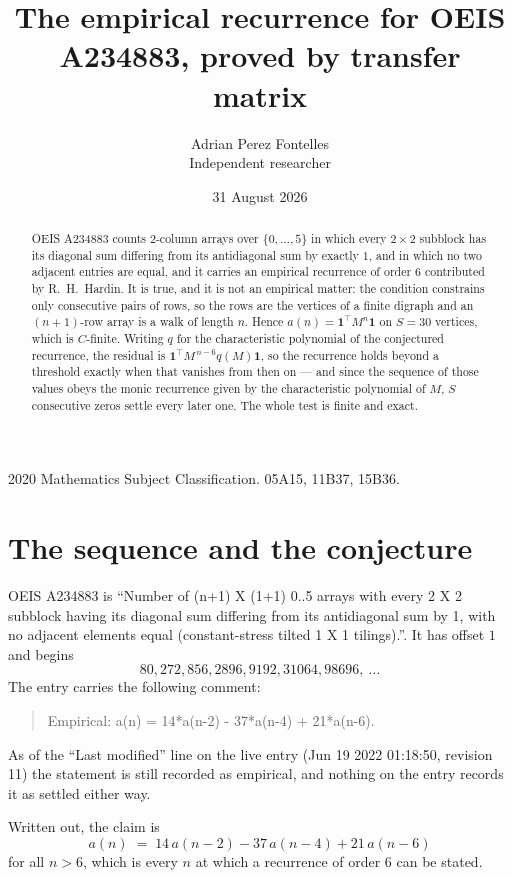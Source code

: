 \documentclass[11pt,a4paper]{article}
\title{The empirical recurrence for OEIS A234883, proved by transfer matrix}
\author{Adrian Perez Fontelles\\ \small Independent researcher}
\date{31 August 2026}
\theoremstyle{plain}
\theoremstyle{definition}
\begin{document}
\maketitle

\begin{abstract}
OEIS A234883 counts $2$-column arrays over $\{0,\dots,5\}$ in which every
$2\times2$ subblock has its diagonal sum differing from its antidiagonal sum by
exactly $1$, and in which no two adjacent entries are equal, and it
carries an empirical recurrence of order $6$ contributed by R.~H.~Hardin. It is true,
and it is not an empirical matter: the condition constrains only consecutive pairs of rows,
so the rows are the vertices of a finite digraph and an $(n+1)$-row array is a walk of
length $n$. Hence $a(n)=\mathbf{1}^{\!\top}M^{n}\mathbf{1}$ on $S=30$ vertices, which
is $C$-finite. Writing $q$ for the characteristic polynomial of the conjectured recurrence,
the residual is $\mathbf{1}^{\!\top}M^{\,n-6}q(M)\mathbf{1}$, so the recurrence
holds beyond a threshold exactly when that vanishes from then on --- and since the sequence
of those values obeys the monic recurrence given by the characteristic polynomial of $M$,
$S$ consecutive zeros settle every later one. The whole test is finite and exact.
\end{abstract}

\noindent\small 2020 Mathematics Subject Classification. 05A15, 11B37, 15B36.\normalsize

\section{The sequence and the conjecture}

OEIS A234883 is ``Number of (n+1) X (1+1) 0..5 arrays with every 2 X 2 subblock having its diagonal sum differing from its antidiagonal sum by 1, with no adjacent elements equal (constant-stress tilted 1 X 1 tilings).''. It has offset
$1$ and begins
\[
80, 272, 856, 2896, 9192, 31064, 98696,\ \dots
\]
The entry carries the following comment:
\begin{quote}\small
Empirical: a(n) = 14*a(n-2) - 37*a(n-4) + 21*a(n-6).
\end{quote}
As of the ``Last modified'' line on the live entry (Jun 19 2022 01:18:50, revision 11) the statement is
still recorded as empirical, and nothing on the entry records it as settled either way.

Written out, the claim is
\begin{equation}\label{eq:conj}
a(n)\;=\;14\,a(n-2) - 37\,a(n-4) + 21\,a(n-6)
\end{equation}
for all $n>6$, which is every $n$ at which a recurrence of order $6$ can be
stated.
\end{document}
